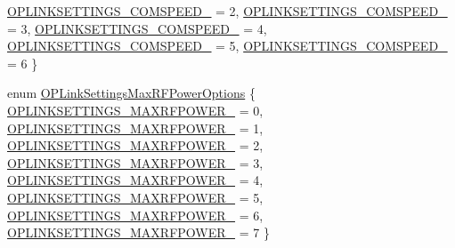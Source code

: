 \begin{DoxyCompactItemize}
\hyperlink{group___o_p_link_settings_ggaf4886a2c0a8f8a79c93d27c94ee503baa07373dd78e8976c4c21e2630584b5e39}{\-O\-P\-L\-I\-N\-K\-S\-E\-T\-T\-I\-N\-G\-S\-\_\-\-C\-O\-M\-S\-P\-E\-E\-D\-\_} = 2, 
\hyperlink{group___o_p_link_settings_ggaf4886a2c0a8f8a79c93d27c94ee503baaf3b2e0498d16c58e8ac1da1e4f7750b4}{\-O\-P\-L\-I\-N\-K\-S\-E\-T\-T\-I\-N\-G\-S\-\_\-\-C\-O\-M\-S\-P\-E\-E\-D\-\_} = 3, 
\*
\hyperlink{group___o_p_link_settings_ggaf4886a2c0a8f8a79c93d27c94ee503baa1d00b147aaba72aec66d253399f371fa}{\-O\-P\-L\-I\-N\-K\-S\-E\-T\-T\-I\-N\-G\-S\-\_\-\-C\-O\-M\-S\-P\-E\-E\-D\-\_} = 4, 
\hyperlink{group___o_p_link_settings_ggaf4886a2c0a8f8a79c93d27c94ee503baa58ffc1cb24df3fe8f8814dbc4e2ba58c}{\-O\-P\-L\-I\-N\-K\-S\-E\-T\-T\-I\-N\-G\-S\-\_\-\-C\-O\-M\-S\-P\-E\-E\-D\-\_} = 5, 
\hyperlink{group___o_p_link_settings_ggaf4886a2c0a8f8a79c93d27c94ee503baabd1979e204892cdd57b8f9b4d1e990ca}{\-O\-P\-L\-I\-N\-K\-S\-E\-T\-T\-I\-N\-G\-S\-\_\-\-C\-O\-M\-S\-P\-E\-E\-D\-\_} = 6
 \}
\item 
enum \hyperlink{group___o_p_link_settings_gaa6ba53655d190e57c8c664fcda898438}{\-O\-P\-Link\-Settings\-Max\-R\-F\-Power\-Options} \{ \*
\hyperlink{group___o_p_link_settings_ggaa6ba53655d190e57c8c664fcda898438a1025b77aa91a0acd74707233bffa8f5a}{\-O\-P\-L\-I\-N\-K\-S\-E\-T\-T\-I\-N\-G\-S\-\_\-\-M\-A\-X\-R\-F\-P\-O\-W\-E\-R\-\_} = 0, 
\hyperlink{group___o_p_link_settings_ggaa6ba53655d190e57c8c664fcda898438a4f054d5368d8fe6b504ae9ab494f8553}{\-O\-P\-L\-I\-N\-K\-S\-E\-T\-T\-I\-N\-G\-S\-\_\-\-M\-A\-X\-R\-F\-P\-O\-W\-E\-R\-\_} = 1, 
\hyperlink{group___o_p_link_settings_ggaa6ba53655d190e57c8c664fcda898438aab05c60b9c12293cad587234cab9c839}{\-O\-P\-L\-I\-N\-K\-S\-E\-T\-T\-I\-N\-G\-S\-\_\-\-M\-A\-X\-R\-F\-P\-O\-W\-E\-R\-\_} = 2, 
\hyperlink{group___o_p_link_settings_ggaa6ba53655d190e57c8c664fcda898438a9ea8e307cea4feefb4a9246a3145934b}{\-O\-P\-L\-I\-N\-K\-S\-E\-T\-T\-I\-N\-G\-S\-\_\-\-M\-A\-X\-R\-F\-P\-O\-W\-E\-R\-\_} = 3, 
\*
\hyperlink{group___o_p_link_settings_ggaa6ba53655d190e57c8c664fcda898438adc0f3fd7ef7b463786298dcef4d86360}{\-O\-P\-L\-I\-N\-K\-S\-E\-T\-T\-I\-N\-G\-S\-\_\-\-M\-A\-X\-R\-F\-P\-O\-W\-E\-R\-\_} = 4, 
\hyperlink{group___o_p_link_settings_ggaa6ba53655d190e57c8c664fcda898438af1bc9f115adb7d725603d82ea3e646be}{\-O\-P\-L\-I\-N\-K\-S\-E\-T\-T\-I\-N\-G\-S\-\_\-\-M\-A\-X\-R\-F\-P\-O\-W\-E\-R\-\_} = 5, 
\hyperlink{group___o_p_link_settings_ggaa6ba53655d190e57c8c664fcda898438a0735bd25c55bbcdeae8013096c2e203a}{\-O\-P\-L\-I\-N\-K\-S\-E\-T\-T\-I\-N\-G\-S\-\_\-\-M\-A\-X\-R\-F\-P\-O\-W\-E\-R\-\_} = 6, 
\hyperlink{group___o_p_link_settings_ggaa6ba53655d190e57c8c664fcda898438a88461ab468939a2b86d04e9d0399dfa4}{\-O\-P\-L\-I\-N\-K\-S\-E\-T\-T\-I\-N\-G\-S\-\_\-\-M\-A\-X\-R\-F\-P\-O\-W\-E\-R\-\_} = 7
 \}
\end{DoxyCompactItemize}
